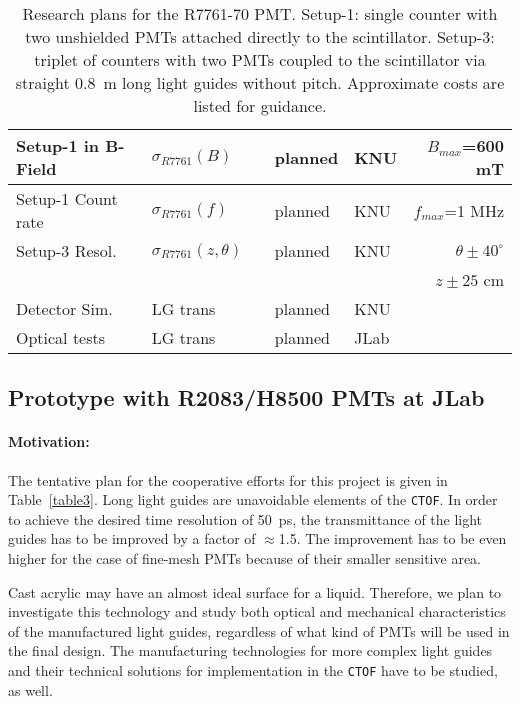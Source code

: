\documentclass[12pt]{article}
\begin{document}
\begin{table}[htbp]
\begin{center}
\begin{tabular}{|l|l|c|l|l|r|}
Setup-1 in B-Field    &$\sigma_{R7761}(B)$ &   & planned & KNU    & $B_{max}$=600 mT           \\ \hline
Setup-1 Count rate &$\sigma_{R7761}(f)$ &   & planned & KNU    & $f_{max}$=1 MHz            \\ \hline
Setup-3 Resol.        &$\sigma_{R7761}(z,\theta)$&     & planned  & KNU    & $\theta\pm40^\circ$ \\
                      &                          &     &          &        & $z\pm25$ cm         \\ \hline
Detector Sim.         &LG trans &       & planned  & KNU      &           \\ \hline
Optical tests         &LG trans &       & planned  & JLab     &           \\ \hline
\end{tabular}
\end{center}
\caption{Research plans for the R7761-70 PMT.  Setup-1: single counter with 
two unshielded PMTs attached directly to the scintillator. Setup-3: triplet 
of counters with two PMTs coupled to the scintillator via straight 0.8~m 
long light guides without pitch.  Approximate costs are listed for guidance.}
\label{table2}
\end{table}

\subsection{Prototype with R2083/H8500 PMTs at JLab}

\paragraph{Motivation:}
The tentative plan for the cooperative efforts for this project is given 
in Table~\ref{table3}.  Long light guides are unavoidable elements of the 
{\tt CTOF}.  In order to achieve the desired time resolution of 50~ps, the  
transmittance of the light guides has to be improved by a factor of 
$\approx$1.5.  The improvement has to be even higher for the case of  
fine-mesh PMTs because of their smaller sensitive area.

Cast acrylic may have an almost ideal surface for a liquid.  Therefore, we 
plan to investigate this technology and study both optical and mechanical  
characteristics of the manufactured light guides, regardless of what kind of 
PMTs will be used in the final design.  The manufacturing technologies for 
more complex light guides and their technical solutions for implementation in 
the {\tt CTOF} have to be studied, as well. 
\end{document}

